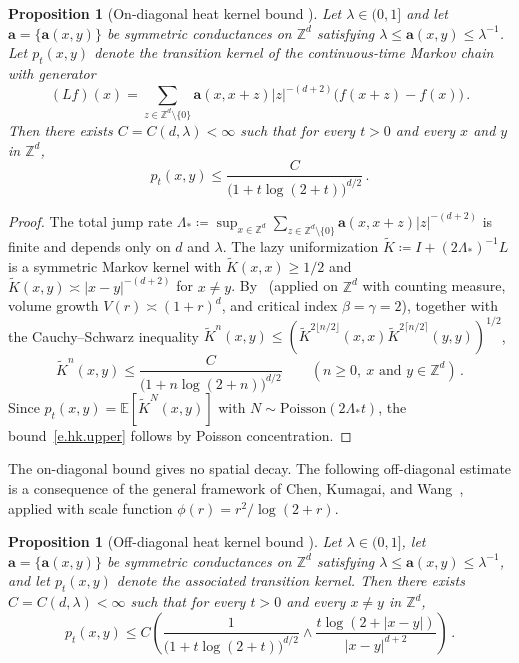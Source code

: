 \documentclass[11pt]{amsart}
\theoremstyle{plain}
\newtheorem{proposition}[theorem]{Proposition}
\theoremstyle{definition}
\theoremstyle{remark}
\newcommand{\E}{\mathbb{E}}
\newcommand{\Zd}{\mathbb{Z}^d}
\renewcommand{\a}{\mathbf{a}}
\begin{document}
	\begin{proposition}[On-diagonal heat kernel bound {\cite[Theorem~1.1]{MuruganSaloffCoste2015}}]
		\label{p.heatkernel}
		Let $\lambda \in (0,1]$ and let $\a = \{\a(x,y)\}$ be symmetric conductances on $\Zd$ satisfying $\lambda \le \a(x,y) \le \lambda^{-1}$.
		Let $p_t(x,y)$ denote the transition kernel of the continuous-time Markov chain with generator
		\[
		(Lf)(x) = \sum_{z \in \Zd \setminus \{0\}} \a(x, x{+}z) |z|^{-(d+2)} \bigl(f(x{+}z) - f(x)\bigr)\,.
		\]
		Then there exists $C = C(d,\lambda) < \infty$ such that for every $t > 0$ and every $x$ and $y$ in $\Zd$,
		\begin{equation}
			\label{e.hk.upper}
			p_t(x,y) \le \frac{C}{\bigl(1 + t \log(2{+}t)\bigr)^{d/2}}\,.
		\end{equation}
	\end{proposition}
	
	\begin{proof}
		The total jump rate $\Lambda_* \coloneqq \sup_{x \in \Zd}\sum_{z \in \Zd \setminus \{0\}}\a(x,x{+}z)|z|^{-(d+2)}$ is finite and depends only on $d$ and $\lambda$.
		The lazy uniformization $\widetilde K \coloneqq I + (2\Lambda_*)^{-1}L$ is a symmetric Markov kernel with $\widetilde K(x,x) \ge 1/2$ and $\widetilde K(x,y) \asymp |x-y|^{-(d+2)}$ for $x \ne y$.
		By~\cite[Theorem~1.1]{MuruganSaloffCoste2015} (applied on $\Zd$ with counting measure, volume growth $V(r) \asymp (1+r)^d$, and critical index $\beta = \gamma = 2$), together with the Cauchy--Schwarz inequality $\widetilde K^n(x,y) \le (\widetilde K^{2\lfloor n/2\rfloor}(x,x)\widetilde K^{2\lceil n/2\rceil}(y,y))^{1/2}$,
		\[
		\widetilde K^n(x,y) \le \frac{C}{\bigl(1 + n\log(2{+}n)\bigr)^{d/2}} \qquad (n \ge 0,\ x \text{ and } y \in \Zd)\,.
		\]
		Since $p_t(x,y) = \E[\widetilde K^N(x,y)]$ with $N \sim \mathrm{Poisson}(2\Lambda_* t)$, the bound~\eqref{e.hk.upper} follows by Poisson concentration.
	\end{proof}
	
	The on-diagonal bound gives no spatial decay.
	The following off-diagonal estimate is a consequence of the general framework of Chen, Kumagai, and Wang~\cite[Theorem~1.12]{ChenKumagaiWang2019}, applied with scale function $\phi(r) = r^2/\log(2{+}r)$.
	
	\begin{proposition}[Off-diagonal heat kernel bound {\cite[Theorem~1.12]{ChenKumagaiWang2019}}]
		\label{p.heatkernel.offdiag}
		Let $\lambda \in (0,1]$, let $\a = \{\a(x,y)\}$ be symmetric conductances on $\Zd$ satisfying $\lambda \le \a(x,y) \le \lambda^{-1}$, and let $p_t(x,y)$ denote the associated transition kernel.
		Then there exists $C = C(d,\lambda) < \infty$ such that for every $t > 0$ and every $x \ne y$ in $\Zd$,
		\begin{equation}
			\label{e.hk.offdiag}
			p_t(x,y) \le C\left(\frac{1}{\bigl(1 + t\log(2{+}t)\bigr)^{d/2}} \wedge \frac{t\log(2{+}|x-y|)}{|x-y|^{d+2}}\right)\,.
		\end{equation}
	\end{proposition}
	
\end{document}
